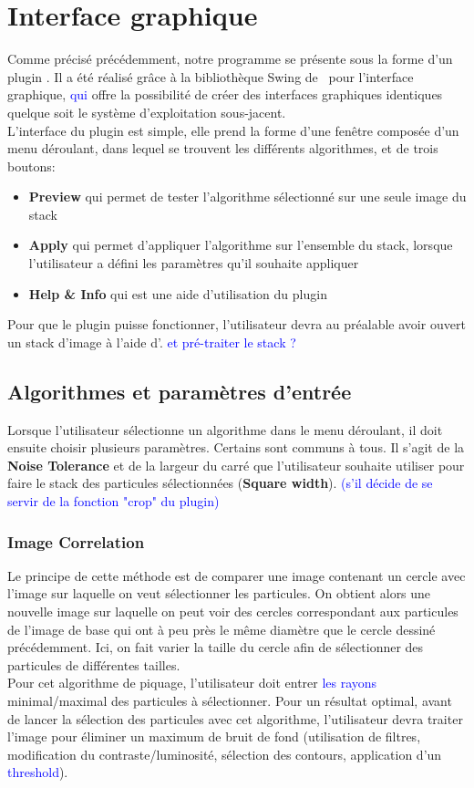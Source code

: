 \documentclass[11pt,a4paper]{report}
\begin{document}
\section{Interface graphique}
Comme précisé précédemment, notre programme se présente sous la forme d'un plugin \imj. Il a été réalisé grâce à la bibliothèque Swing de \java ~pour l'interface graphique, \textcolor{blue}{qui} offre la possibilité de créer des interfaces graphiques identiques quelque soit le système d'exploitation sous-jacent.\\
L'interface du plugin est simple, elle prend la forme d'une fenêtre composée d'un menu déroulant, dans lequel se trouvent les différents algorithmes, et de trois boutons:
\begin{itemize}
\item \textbf{Preview} qui permet de tester l'algorithme sélectionné sur une seule image du stack
\item \textbf{Apply} qui permet d'appliquer l'algorithme sur l'ensemble du stack, lorsque l'utilisateur a défini les paramètres qu'il souhaite appliquer
\item \textbf{Help \& Info} qui est une aide d'utilisation du plugin
\end{itemize}
Pour que le plugin puisse fonctionner, l'utilisateur devra au préalable avoir ouvert un stack d'image à l'aide d'\imj. \textcolor{blue}{et pré-traiter le stack ?}

\subsection{Algorithmes et paramètres d'entrée}
Lorsque l'utilisateur sélectionne un algorithme dans le menu déroulant, il doit ensuite choisir plusieurs paramètres.
Certains sont communs à tous. Il s'agit de la \textbf{Noise Tolerance} et de la largeur du carré que l'utilisateur souhaite utiliser pour faire le stack des particules sélectionnées (\textbf{Square width}). \textcolor{blue}{(s'il décide de se servir de la fonction "crop" du plugin)}
\subsubsection{Image Correlation}
Le principe de cette méthode est de comparer une image contenant un cercle avec l'image sur laquelle on veut sélectionner les particules. On obtient alors une nouvelle image sur laquelle on peut voir des cercles correspondant aux particules de l'image de base qui ont à peu près le même diamètre que le cercle dessiné précédemment. Ici, on fait varier la taille du cercle afin de sélectionner des particules de différentes tailles.\\
\noindent
Pour cet algorithme de piquage, l'utilisateur doit entrer \textcolor{blue}{les rayons} minimal/maximal des particules à sélectionner. Pour un résultat optimal, avant de lancer la sélection des particules avec cet algorithme, l'utilisateur devra traiter l'image pour éliminer un maximum de bruit de fond (utilisation de filtres, modification du contraste/luminosité, sélection des contours, application d'un \textcolor{blue}{threshold}).
\end{document}
